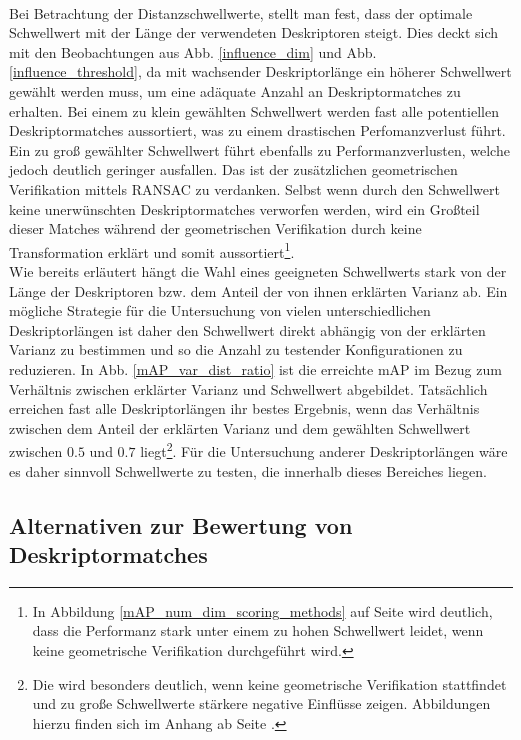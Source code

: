 \\
Bei Betrachtung der Distanzschwellwerte, stellt man fest, dass der optimale Schwellwert mit der Länge der verwendeten Deskriptoren steigt. Dies deckt sich mit den Beobachtungen aus Abb. \ref{influence_dim} und Abb. \ref{influence_threshold}, da mit wachsender Deskriptorlänge ein höherer Schwellwert gewählt werden muss, um eine adäquate Anzahl an Deskriptormatches zu erhalten. Bei einem zu klein gewählten Schwellwert werden fast alle potentiellen Deskriptormatches aussortiert, was zu einem drastischen Perfomanzverlust führt. Ein zu groß gewählter Schwellwert führt ebenfalls zu Performanzverlusten, welche jedoch deutlich geringer ausfallen. Das ist der zusätzlichen geometrischen Verifikation mittels RANSAC zu verdanken. Selbst wenn durch den Schwellwert keine unerwünschten Deskriptormatches verworfen werden, wird ein Großteil dieser Matches während der geometrischen Verifikation durch keine Transformation erklärt und somit aussortiert\footnote{In Abbildung \ref{mAP_num_dim_scoring_methods} auf Seite \pageref{mAP_num_dim_scoring_methods} wird deutlich, dass die Performanz stark unter einem zu hohen Schwellwert leidet, wenn keine geometrische Verifikation durchgeführt wird.}. \\
Wie bereits erläutert hängt die Wahl eines geeigneten Schwellwerts stark von der Länge der Deskriptoren bzw. dem Anteil der von ihnen erklärten Varianz ab. Ein mögliche Strategie für die Untersuchung von vielen unterschiedlichen Deskriptorlängen ist daher den Schwellwert direkt abhängig von der erklärten Varianz zu bestimmen und so die Anzahl zu testender Konfigurationen zu reduzieren. In Abb. \ref{mAP_var_dist_ratio} ist die erreichte mAP im Bezug zum Verhältnis zwischen erklärter Varianz und Schwellwert abgebildet. Tatsächlich erreichen fast alle Deskriptorlängen ihr bestes Ergebnis, wenn das Verhältnis zwischen dem Anteil der erklärten Varianz und dem gewählten Schwellwert zwischen $0.5$ und $0.7$ liegt\footnote{Die wird besonders deutlich, wenn keine geometrische Verifikation stattfindet und zu große Schwellwerte stärkere negative Einflüsse zeigen. Abbildungen hierzu finden sich im Anhang ab Seite \pageref{mAP_var_dist_ratio_alternative_scoring}.}. Für die Untersuchung anderer Deskriptorlängen wäre es daher sinnvoll Schwellwerte zu testen, die innerhalb dieses Bereiches liegen.

\subsection{Alternativen zur Bewertung von Deskriptormatches}\label{metric_experiment}

